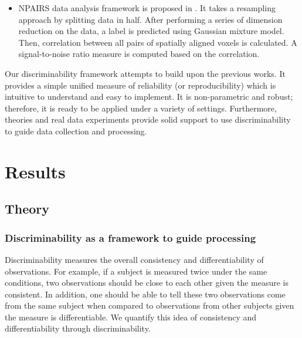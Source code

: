 \documentclass{article}
\begin{document}
\begin{itemize}
	\item NPAIRS data analysis framework is proposed in \cite{strother2002quantitative}. It takes a resampling approach by splitting data in half. After performing a series of dimension reduction on the data, a label is predicted using Gaussian mixture model. Then, correlation between 
	all pairs of spatially aligned voxels is calculated. A signal-to-noise ratio measure is computed based on the correlation.
\end{itemize}
Our discriminability framework attempts to build upon the previous works. It provides a simple unified measure of reliability (or reproducibility) which is intuitive to understand and easy to implement. It is non-parametric and robust; therefore, it is ready to be applied under a variety of settings. Furthermore, theories and real data experiments provide solid support to use discriminability to guide data collection and processing. 

\section{Results}
\subsection{Theory}

\subsubsection{Discriminability as a framework to guide processing}
Discriminability measures the overall consistency and differentiability of observations. For example, if a subject is measured twice under the same conditions, two observations should be close to each other given the measure is consistent. In addition, one should be able to tell these two observations come from the same subject when compared to observations from other subjects given the measure is differentiable. We quantify this idea of consistency and differentiability through discriminability. 
\end{document}
